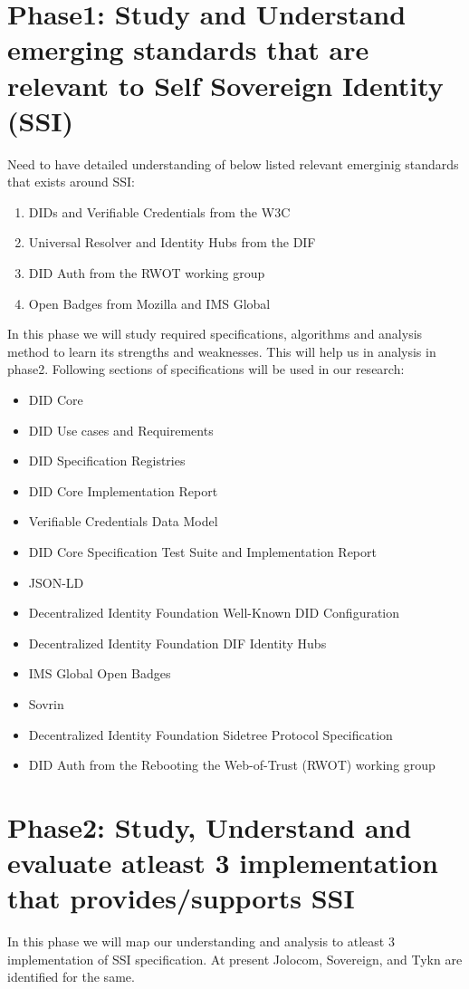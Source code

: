 \section{Phase1: Study and Understand emerging standards that are relevant to Self Sovereign Identity (SSI)}
Need to have detailed understanding of below listed relevant emerginig standards that exists around SSI:
\begin{enumerate}
    \item \ac{DIDs} and Verifiable Credentials from the \ac{W3C}
    \item Universal Resolver and Identity Hubs from the \ac{DIF}
    \item DID Auth from the \ac{RWOT} working group
    \item Open Badges from Mozilla and IMS Global
\end{enumerate}
In this phase we will study required specifications, algorithms and  analysis method to learn its strengths and weaknesses. This will help us in analysis in phase2.
Following sections of specifications will be used in our research:
\begin{itemize}
    \item DID Core
    \item DID Use cases and Requirements
    \item DID Specification Registries
    \item DID Core Implementation Report
    \item Verifiable Credentials Data Model
    \item DID Core Specification Test Suite and Implementation Report
    \item \ac{JSON-LD}
    \item Decentralized Identity Foundation Well-Known DID Configuration
    \item Decentralized Identity Foundation DIF Identity Hubs
    \item IMS Global Open Badges
    \item Sovrin
    \item Decentralized Identity Foundation Sidetree Protocol Specification
    \item DID Auth from the Rebooting the Web-of-Trust (RWOT) working group
\end{itemize}

\section{Phase2: Study, Understand and evaluate atleast 3 implementation that provides/supports SSI}
In this phase we will map our understanding and analysis to atleast 3 implementation of SSI specification. At present Jolocom, Sovereign, and Tykn are identified for the same.

